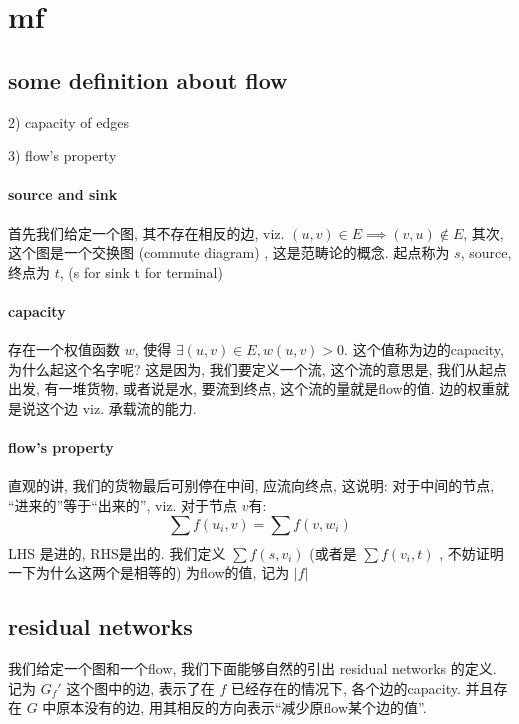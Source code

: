 \documentclass[a4paper, 10pt]{ctexart} %
\begin{document}
\section{mf}
\subsection{some definition about flow}
2) capacity of edges 

3) flow's property

\paragraph{source and sink} %
首先我们给定一个图, 其不存在相反的边, viz. $ \left(u ,v\right) \in E \implies \left( v, u\right) \notin E $, 
其次, 这个图是一个交换图 (commute diagram) , 这是范畴论的概念. 起点称为 $ s $, source, 终点为 $ t $,  (s for sink t for terminal) 

\paragraph{capacity} %
存在一个权值函数 $ w $, 
使得 $ \exists \left( u ,v\right) \in E, w \left( u  , v\right) > 0 $. 这个值称为边的capacity, 
为什么起这个名字呢? 这是因为, 我们要定义一个流, 这个流的意思是, 我们从起点出发, 有一堆货物, 或者说是水, 要流到终点, 
这个流的量就是flow的值. 边的权重就是说这个边 viz. 承载流的能力. 

\paragraph{flow's property} %
直观的讲, 我们的货物最后可别停在中间, 应流向终点, 这说明: 对于中间的节点, ``进来的''等于``出来的'', viz. 对于节点 $ v $有: 
$$ 
\sum_{}  f\left(u_{i} , v\right) = \sum_{} f \left(v , w _{i}\right) 
$$
LHS 是进的, RHS是出的. 
我们定义 $ \sum f(s , v_i) $ (或者是 $ \sum f( v_i , t) $ , 不妨证明一下为什么这两个是相等的) 为flow的值, 记为
$|f|$

\subsection{residual networks}
我们给定一个图和一个flow, 我们下面能够自然的引出 residual networks 的定义. 记为 $ G_f' $ 这个图中的边, 表示了在 $ f $ 已经存在的情况下, 各个边的capacity. 并且存在 $ G $ 中原本没有的边, 用其相反的方向表示``减少原flow某个边的值''.
\end{document}
